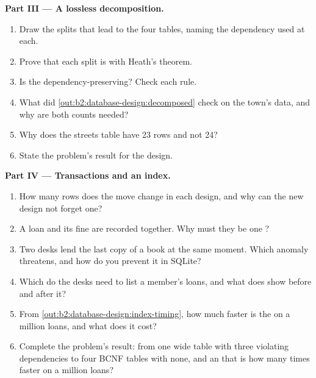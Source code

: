 \begin{problem}
\medskip\noindent\textbf{Part III --- A lossless decomposition.}\par\nopagebreak
\begin{enumerate}[resume, beginpenalty=10000]
\item Draw the splits that lead to the four tables, naming the dependency used at each.
\item Prove that each split is  with Heath's theorem.
\item Is the  dependency-preserving? Check each rule.
\item What did \cref{out:b2:database-design:decomposed} check on the town's data, and why are both counts needed?
\item Why does the streets table have 23 rows and not 24?
\item State the problem's result for the design.
\end{enumerate}

\medskip\noindent\textbf{Part IV --- Transactions and an index.}\par\nopagebreak
\begin{enumerate}[resume, beginpenalty=10000]
\item How many rows does the move change in each design, and why can the new design not forget one?
\item A loan and its fine are recorded together. Why must they be one ?
\item Two desks lend the last copy of a book at the same moment. Which anomaly threatens, and how do you prevent it in
SQLite?
\item Which  do the desks need to list a member's loans, and what does  show before and
after it?
\item From \cref{out:b2:database-design:index-timing}, how much faster is the  on a million loans, and what does it
cost?
\item Complete the problem's result: from one wide table with three violating dependencies to four BCNF tables with
none, and an  that is how many times faster on a million loans?
\end{enumerate}
\end{problem}
